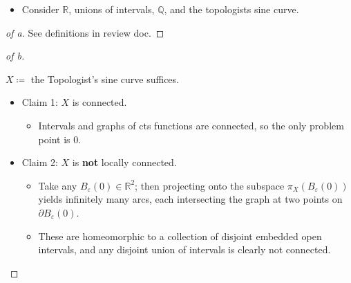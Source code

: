 \begin{solution}

\envlist

\begin{concept}

\envlist

\begin{itemize}
\tightlist
\item
  Consider \({\mathbb{R}}\), unions of intervals, \({\mathbb{Q}}\), and
  the topologists sine curve.
\end{itemize}

\end{concept}

\begin{proof}[of a]

See definitions in review doc.

\end{proof}

\begin{proof}[of b]

\begin{claim}

\(X\coloneqq\) the Topologist's sine curve suffices.

\end{claim}

\begin{itemize}
\tightlist
\item
  Claim 1: \(X\) is connected.

  \begin{itemize}
  \tightlist
  \item
    Intervals and graphs of cts functions are connected, so the only
    problem point is \(0\).
  \end{itemize}
\item
  Claim 2: \(X\) is \textbf{not} locally connected.

  \begin{itemize}
  \tightlist
  \item
    Take any \(B_\varepsilon(0) \in {\mathbb{R}}^2\); then projecting
    onto the subspace \(\pi_X(B_\varepsilon(0))\) yields infinitely many
    arcs, each intersecting the graph at two points on
    \({{\partial}}B_\varepsilon(0)\).
  \item
    These are homeomorphic to a collection of disjoint embedded open
    intervals, and any disjoint union of intervals is clearly not
    connected.
  \end{itemize}
\end{itemize}

\end{proof}

\end{solution}

